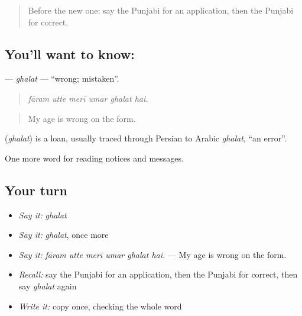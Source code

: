 \label{lesson:PA-C254-ghalat}



\begin{quote}
Before the new one: say the Punjabi for an application, then the Punjabi for correct.
\end{quote}

\subsection*{You'll want to know: }
\textbf{} — \emph{ghalat} — \textquotedblleft{}wrong; mistaken\textquotedblright{}.

\begin{quote}
     
\end{quote}

\begin{quote}
\emph{fāram utte merī umar ghalat hai.}
\end{quote}

\begin{quote}
My age is wrong on the form.
\end{quote}

\begin{cousinweb}
\textbf{} (\emph{ghalat}) is a loan, usually traced through Persian to Arabic \emph{ghalat}, \textquotedblleft{}an error\textquotedblright{}.
\end{cousinweb}

\begin{grammarlens}[title={What you've built}]
One more word for reading notices and messages.
\end{grammarlens}

\subsection*{Your turn}
\begin{itemize}
\raggedright
  \item \emph{Say it:} \emph{ghalat}
  \item \emph{Say it:} \emph{ghalat}, once more
  \item \emph{Say it:} \emph{fāram utte merī umar ghalat hai.} — My age is wrong on the form.
  \item \emph{Recall:} say the Punjabi for an application, then the Punjabi for correct, then say \emph{ghalat} again
  \item \emph{Write it:} copy \textbf{} once, checking the whole word
\end{itemize}

